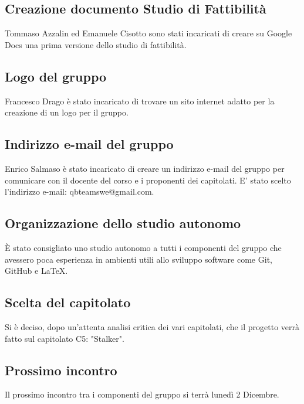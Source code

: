 \subsection{Creazione documento Studio di Fattibilità}
Tommaso Azzalin ed Emanuele Cisotto sono stati incaricati di creare su Google Docs una prima versione dello studio di fattibilità.

\subsection{Logo del gruppo}
Francesco Drago è stato incaricato di trovare un sito internet adatto per la creazione di un logo per il gruppo.

\subsection{Indirizzo e-mail del gruppo}
Enrico Salmaso è stato incaricato di creare un indirizzo e-mail del gruppo per comunicare con il docente del corso e i proponenti dei capitolati.
E' stato scelto l'indirizzo e-mail: qbteamswe@gmail.com.

\subsection{Organizzazione dello studio autonomo}
È stato consigliato uno studio autonomo a tutti i componenti del gruppo che avessero poca esperienza in ambienti utili allo sviluppo software come Git, GitHub e \LaTeX.\\

\subsection{Scelta del capitolato}
Si è deciso, dopo un'attenta analisi critica dei vari capitolati, che il progetto verrà fatto sul capitolato C5: "Stalker".

\subsection{Prossimo incontro}
Il prossimo incontro tra i componenti del gruppo si terrà lunedì 2 Dicembre.
\clearpage